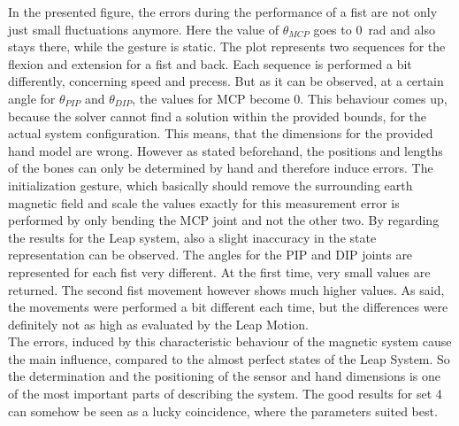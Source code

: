 In the presented figure, the errors during the performance of a fist are not only just small fluctuations anymore. Here the value of $ \theta_{MCP} $ goes to \SI{0}{\radian} and also stays there, while the gesture is static. The plot represents two sequences for the flexion and extension for a fist and back. Each sequence is performed a bit differently, concerning speed and precess. But as it can be observed, at a certain angle for $ \theta_{PIP} $ and $ \theta_{DIP} $, the values for \ac{MCP} become 0. This behaviour comes up, because the solver cannot find a solution within the provided bounds, for the actual system configuration. This means, that the dimensions for the provided hand model are wrong. However as stated beforehand, the positions and lengths of the bones can only be determined by hand and therefore induce errors. The initialization gesture, which basically should remove the surrounding earth magnetic field and scale the values exactly for this measurement error is performed by only bending the \ac{MCP} joint and not the other two. By regarding the results for the Leap system, also a slight inaccuracy in the state representation can be observed. The angles for the \ac{PIP} and \ac{DIP} joints are represented for each fist very different. At the first time, very small values are returned. The second fist movement however shows much higher values. As said, the movements were performed a bit different each time, but the differences were definitely not as high as evaluated by the Leap Motion. \\
The errors, induced by this characteristic behaviour of the magnetic system cause the main influence, compared to the almost perfect states of the Leap System. So the determination and the positioning of the sensor and hand dimensions is one of the most important parts of describing the system. The good results for set 4 can somehow be seen as a lucky coincidence, where the parameters suited best.


